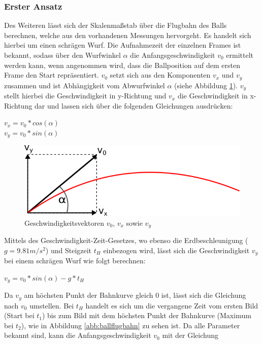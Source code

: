 \documentclass{ezb}
\begin{document}
\subsubsection*{Erster Ansatz}
Des Weiteren lässt sich der Skalenmaßstab über die Flugbahn des Balls berechnen, welche aus den vorhandenen Messungen hervorgeht. Es handelt sich hierbei um einen schrägen Wurf.
Die Aufnahmezeit der einzelnen Frames ist bekannt, sodass über den Wurfwinkel $\alpha$ die Anfangsgeschwindigkeit $v_0$ ermittelt werden kann, wenn angenommen wird, dass die Ballposition auf dem ersten Frame den Start repräsentiert. $v_0$ setzt sich aus den Komponenten $v_x$ und $v_y$ zusammen und ist Abhängigkeit vom Abwurfwinkel $\alpha$ (siehe Abbildung \ref{abb:geschwindigkeiten}). $v_y$ stellt hierbei die Geschwindigkeit in y-Richtung und $v_x$ die Geschwindigkeit in x-Richtung dar und lassen sich über die folgenden Gleichungen ausdrücken:
\begin{center}
$v_x = v_0 * cos(\alpha)$ \\
$v_y = v_0 * sin(\alpha)$
\end{center}
\begin{figure}[!h]
	\centering
	\includegraphics[scale=0.8]{./img/geschwindigkeitsrichtung.png}
	\caption{Geschwindigkeitsvektoren $v_0$, $v_x$ sowie $v_y$}
	\label{abb:geschwindigkeiten}
\end{figure}
Mittels des Geschwindigkeit-Zeit-Gesetzes, wo ebenso die Erdbeschleunigung ($g = 9.81m/s^2$) und Steigzeit $t_H$ einbezogen wird, lässt sich die Geschwindigkeit $v_y$ bei einem schrägen Wurf wie folgt berechnen:
\begin{center}
$v_y = v_0 * sin(\alpha) - g * t_H$
\end{center}
Da $v_y$ am höchsten Punkt der Bahnkurve gleich 0 ist, lässt sich die Gleichung nach $v_0$ umstellen. Bei $t_H$ handelt es sich um die vergangene Zeit vom ersten Bild (Start bei $t_1$) bis zum Bild mit dem höchsten Punkt der Bahnkurve (Maximum bei $t_2$), wie in Abbildung \ref{abb:ballflugbahn} zu sehen ist. Da alle Parameter bekannt sind, kann die Anfangsgeschwindigkeit $v_0$  mit der Gleichung 
\end{document}
